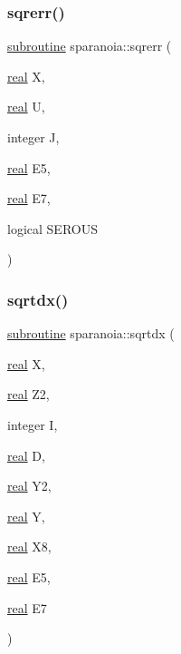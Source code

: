 \subsubsection{\texorpdfstring{sqrerr()}{sqrerr()}}
{\footnotesize\ttfamily \hyperlink{M__stopwatch_83_8txt_acfbcff50169d691ff02d4a123ed70482}{subroutine} sparanoia\+::sqrerr (\begin{DoxyParamCaption}\item[{\hyperlink{read__watch_83_8txt_abdb62bde002f38ef75f810d3a905a823}{real}}]{X,  }\item[{\hyperlink{read__watch_83_8txt_abdb62bde002f38ef75f810d3a905a823}{real}}]{U,  }\item[{integer}]{J,  }\item[{\hyperlink{read__watch_83_8txt_abdb62bde002f38ef75f810d3a905a823}{real}}]{E5,  }\item[{\hyperlink{read__watch_83_8txt_abdb62bde002f38ef75f810d3a905a823}{real}}]{E7,  }\item[{logical}]{S\+E\+R\+O\+US }\end{DoxyParamCaption})}

\mbox{\label{sparanoia_8f90_a010907bd382f4842772e76ab8fd7263a}} 
\subsubsection{\texorpdfstring{sqrtdx()}{sqrtdx()}}
{\footnotesize\ttfamily \hyperlink{M__stopwatch_83_8txt_acfbcff50169d691ff02d4a123ed70482}{subroutine} sparanoia\+::sqrtdx (\begin{DoxyParamCaption}\item[{\hyperlink{read__watch_83_8txt_abdb62bde002f38ef75f810d3a905a823}{real}}]{X,  }\item[{\hyperlink{read__watch_83_8txt_abdb62bde002f38ef75f810d3a905a823}{real}}]{Z2,  }\item[{integer}]{I,  }\item[{\hyperlink{read__watch_83_8txt_abdb62bde002f38ef75f810d3a905a823}{real}}]{D,  }\item[{\hyperlink{read__watch_83_8txt_abdb62bde002f38ef75f810d3a905a823}{real}}]{Y2,  }\item[{\hyperlink{read__watch_83_8txt_abdb62bde002f38ef75f810d3a905a823}{real}}]{Y,  }\item[{\hyperlink{read__watch_83_8txt_abdb62bde002f38ef75f810d3a905a823}{real}}]{X8,  }\item[{\hyperlink{read__watch_83_8txt_abdb62bde002f38ef75f810d3a905a823}{real}}]{E5,  }\item[{\hyperlink{read__watch_83_8txt_abdb62bde002f38ef75f810d3a905a823}{real}}]{E7 }\end{DoxyParamCaption})}

